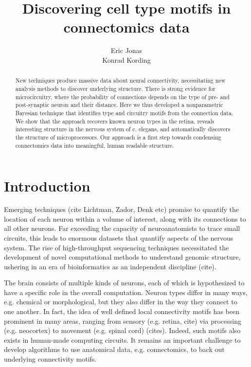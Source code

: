 \documentclass{article}
\title{Discovering cell type motifs in connectomics data}
\author{Eric Jonas \\ Konrad Kording}
\begin{document}
\maketitle

\listoftodos

\begin{abstract}
New techniques produce massive data about neural connectivity, necessitating new analysis methods to discover underlying structure. There is strong evidence for microcircuitry, where the probability of connections depends on the type of pre- and post-synaptic neuron and their distance. Here we thus developed a nonparametric Bayesian technique that identifies type and circuitry motifs from the connection data. We show that the approach recovers known neuron types in the retina, reveals interesting structure in the nervous system of c. elegans, and automatically discovers the structure of microprocessors. Our approach is a first step towards condensing connectomics data into meaningful, human readable structure.
\end{abstract}

\section{Introduction}
Emerging techniques (cite Lichtman, Zador, Denk etc) promise to quantify the location of each neuron within a volume of interest, along with its connections to all other neurons. Far exceeding the capacity of neuroanatomists to trace small circuits, this leads to enormous datasets that quantify aspects of the nervous system. The rise of high-throughput sequencing techniques necessitated the development of novel computational methods to understand genomic structure, ushering in an era of bioinformatics as an independent discipline (cite). 




The brain consists of multiple kinds of neurons, each of which is hypothesized to have a specific role in the overall computation. Neuron types differ in many ways, e.g. chemical or morphological, but they also differ in the way they connect to one another. In fact, the idea of well defined local connectivity motifs has been prominent in many areas, ranging from sensory (e.g. retina, cite) via processing (e.g. neocortex) to movement (e.g. spinal cord) (cites). Indeed, such motifs also exists in human-made computing circuits. It remains an important challenge to develop algorithms  to use anatomical data, e.g. connectomics, to back out underlying connectivity motifs.  
\end{document}
